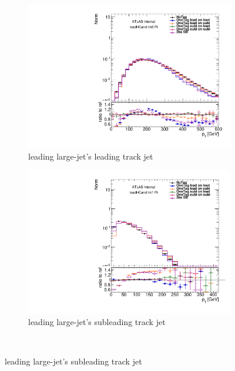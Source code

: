 \begin{figure}[htbp!]
  \centering
  \captionsetup{justification=centering}
    \begin{subfigure}[b]{0.4\textwidth}
        \includegraphics[width=\textwidth,angle=-90]{figures/boosted/Prereweight/2bs_directcompare_leadHCand_trk0_Pt_1.pdf}
        \caption{leading large-\R jet's leading track jet \pt}
        \label{fig:rw-2bs-comp-lead0}
    \end{subfigure}
    \quad \quad 
    \begin{subfigure}[b]{0.4\textwidth}
        \includegraphics[width=\textwidth,angle=-90]{figures/boosted/Prereweight/2bs_directcompare_leadHCand_trk1_Pt_1.pdf}
        \caption{leading large-\R jet's subleading track jet \pt}
        \label{fig:rw-2bs-comp-lead1}
    \end{subfigure} \\ 

\end{figure}
